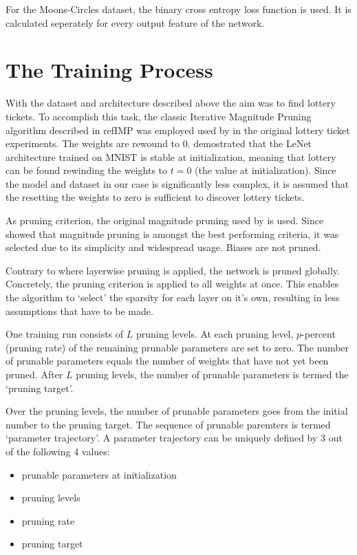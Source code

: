 For the Moons-Circles dataset, the binary cross entropy loss function is used.
It is calculated seperately for every output feature of the network.

\section{The Training Process}
With the dataset and architecture described above the aim was to find lottery tickets.
To accomplish this task, the classic Iterative Magnitude Pruning algorithm described in refIMP was employed used by \textcite{DBLP:conf/iclr/FrankleC19} in the original lottery ticket experiments.
The weights are rewound to $0$.
\textcite{LinearModeConnectivity} demostrated that the LeNet architecture trained on MNIST is stable at initialization, meaning that lottery can be found rewinding the weights to $t=0$ (the value at initialization). 
Since the model and dataset in our case is significantly less complex, it is assumed that the resetting the weights to zero is sufficient to discover lottery tickets.

As pruning criterion, the original magnitude pruning used by \autocite{DBLP:conf/iclr/FrankleC19} is used. 
Since \autocite{DBLP:conf/nips/ZhouLLY19} showed that magnitude pruning is amongst the best performing criteria, it was selected due to its simplicity and widespread usage.
Biases are not pruned.

Contrary to \autocite{DBLP:conf/iclr/FrankleC19} where layerwise pruning is applied, the network is pruned globally.
Concretely, the pruning criterion is applied to all weights at once.
This enables the algorithm to `select' the sparsity for each layer on it's own, resulting in less assumptions that have to be made.

One training run consists of $L$ pruning levels. 
At each pruning level, $p$-percent (pruning rate) of the remaining prunable parameters are set to zero.
The number of prunable parameters equals the number of weights that have not yet been pruned.
After $L$ pruning levels, the number of prunable parameters is termed the `pruning target'.

Over the pruning levels, the number of prunable parameters goes from the initial number to the pruning target.
The sequence of prunable paremters is termed `parameter trajectory'.
A parameter trajectory can be uniquely defined by 3 out of the following 4 values:
\begin{itemize}
    \item prunable parameters at initialization
    \item pruning levels
    \item pruning rate
    \item pruning target
\end{itemize}

